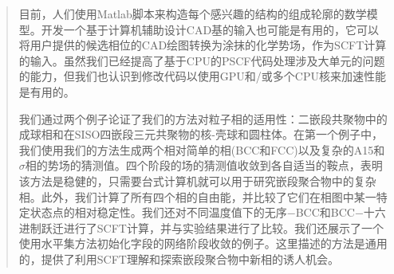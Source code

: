 \documentclass{article}
\begin{document}
\begin{CJK}{UTF8}{gkai}
\begin{quotation}
目前，人们使用Matlab脚本来构造每个感兴趣的结构的组成轮廓的数学模型。开发一个基于计算机辅助设计CAD基的输入也可能是有用的，它可以将用户提供的候选相位的CAD绘图转换为涂抹的化学势场，作为SCFT计算的输入。虽然我们已经提高了基于CPU的PSCF代码处理涉及大单元的问题的能力，但我们也认识到修改代码以使用GPU和/或多个CPU核来加速性能是有用的。

我们通过两个例子论证了我们的方法对粒子相的适用性：二嵌段共聚物中的成球相和在SISO四嵌段三元共聚物的核-壳球和圆柱体。在第一个例子中，我们使用我们的方法生成两个相对简单的相(BCC和FCC)以及复杂的A15和$\sigma$相的势场的猜测值。四个阶段的场的猜测值收敛到各自适当的鞍点，表明该方法是稳健的，只需要台式计算机就可以用于研究嵌段聚合物中的复杂相。此外，我们计算了所有四个相的自由能，并比较了它们在相图中某一特定状态点的相对稳定性。我们还对不同温度值下的无序−BCC和BCC−十六进制跃迁进行了SCFT计算，并与实验结果进行了比较。我们还展示了一个使用水平集方法初始化字段的网络阶段收敛的例子。这里描述的方法是通用的，提供了利用SCFT理解和探索嵌段聚合物中新相的诱人机会。












\end{quotation}
\end{CJK}
\end{document}
